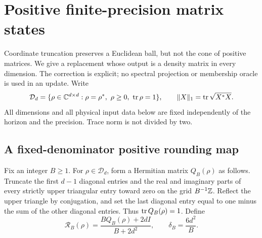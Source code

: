 \section{Positive finite-precision matrix states}\label{sec:positive65}
Coordinate truncation preserves a Euclidean ball, but not the cone of
positive matrices. We give a replacement whose output is a density
matrix in every dimension. The correction is explicit; no spectral
projection or membership oracle is used in an update.
Write
\[
 \mathcal D_d=\{\rho\in\mathbb C^{d\times d}:\rho=\rho^*,\
                    \rho\ge0,\ \operatorname{tr}\rho=1\},\qquad
 \|X\|_1=\operatorname{tr}\sqrt{X^*X}.
\]
All dimensions and all physical input data below are fixed independently
of the horizon and the precision. Trace norm is not divided by two.

\subsection{A fixed-denominator positive rounding map}
Fix an integer $B\ge1$. For $\rho\in\mathcal D_d$, form a Hermitian
matrix $Q_B(\rho)$ as follows. Truncate the first $d-1$ diagonal
entries and the real and imaginary parts of every strictly upper
triangular entry toward zero on the grid $B^{-1}\mathbb Z$. Reflect the upper
triangle by conjugation, and set the last diagonal entry equal to one
minus the sum of the other diagonal entries. Thus $\operatorname{tr} Q_B(\rho)=1$.
Define
\begin{equation}\label{eq:positiveround65}
 \mathcal R_B(\rho)=
       \frac{B Q_B(\rho)+2d I}{B+2d^2},
 \qquad \delta_B=\frac{6d^2}{B}.
\end{equation}

